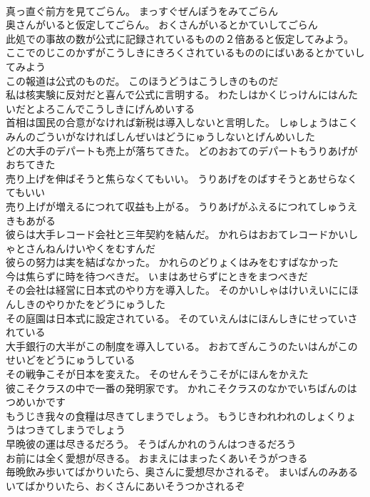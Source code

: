 \documentclass[8pt]{extreport}
\begin{document}
\begin{CJK}{UTF8}{min}
\\	真っ直ぐ前方を見てごらん。	まっすぐぜんぽうをみてごらん 
\\	奥さんがいると仮定してごらん。	おくさんがいるとかていしてごらん 
\\	此処での事故の数が公式に記録されているものの２倍あると仮定してみよう。	ここでのじこのかずがこうしきにきろくされているもののにばいあるとかていしてみよう 
\\	この報道は公式のものだ。	このほうどうはこうしきのものだ 
\\	私は核実験に反対だと喜んで公式に言明する。	わたしはかくじっけんにはんたいだとよろこんでこうしきにげんめいする 
\\	首相は国民の合意がなければ新税は導入しないと言明した。	しゅしょうはこくみんのごういがなければしんぜいはどうにゅうしないとげんめいした 
\\	どの大手のデパートも売上が落ちてきた。	どのおおてのデパートもうりあげがおちてきた 
\\	売り上げを伸ばそうと焦らなくてもいい。	うりあげをのばすそうとあせらなくてもいい 
\\	売り上げが増えるにつれて収益も上がる。	うりあげがふえるにつれてしゅうえきもあがる 
\\	彼らは大手レコード会社と三年契約を結んだ。	かれらはおおてレコードかいしゃとさんねんけいやくをむすんだ 
\\	彼らの努力は実を結ばなかった。	かれらのどりょくはみをむすばなかった 
\\	今は焦らずに時を待つべきだ。	いまはあせらずにときをまつべきだ 
\\	その会社は経営に日本式のやり方を導入した。	そのかいしゃはけいえいににほんしきのやりかたをどうにゅうした 
\\	その庭園は日本式に設定されている。	そのていえんはにほんしきにせっていされている 
\\	大手銀行の大半がこの制度を導入している。	おおてぎんこうのたいはんがこのせいどをどうにゅうしている 
\\	その戦争こそが日本を変えた。	そのせんそうこそがにほんをかえた 
\\	彼こそクラスの中で一番の発明家です。	かれこそクラスのなかでいちばんのはつめいかです 
\\	もうじき我々の食糧は尽きてしまうでしょう。	もうじきわれわれのしょくりょうはつきてしまうでしょう 
\\	早晩彼の運は尽きるだろう。	そうばんかれのうんはつきるだろう 
\\	お前には全く愛想が尽きる。	おまえにはまったくあいそうがつきる 
\\	毎晩飲み歩いてばかりいたら、奥さんに愛想尽かされるぞ。	まいばんのみあるいてばかりいたら、おくさんにあいそうつかされるぞ 

\end{CJK}
\end{document}
